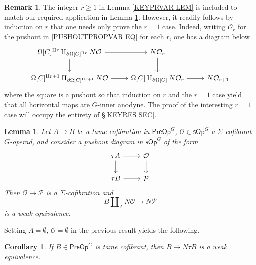\documentclass[a4paper,10pt
,draft
]{article}%
\numberwithin{equation}{section}
\numberwithin{figure}{section}
\newtheorem{lemma}[equation]{Lemma}%
\newtheorem{corollary}[equation]{Corollary}%
\theoremstyle{definition} %
\newtheorem{remark}[equation]{Remark}%
\renewcommand{\O}{\ensuremath{\mathcal O}}
\newcommand{\1}{\ensuremath{\mathbbm 1}}%
\begin{document}
\begin{remark}
	The integer $r \geq 1$ in 
	Lemma \ref{KEYPRVAR LEM}
	is included to match our required application in Lemma \ref{UNITEQUIV LEM}.
	However, it readily follows by induction on $r$ that one needs only prove the $r=1$ case.
	Indeed, writing $\O_r$ for the pushout in 
	\eqref{PUSHOUTPROPVAR EQ}
	for each $r$,
	one has a diagram below
\begin{equation}
\begin{tikzcd}
	\Omega[C]^{\amalg r} \amalg_{\partial \Omega[C]^{\amalg r}} N\mathcal{O} \ar{r} \ar{d}
&
	N \mathcal{O}_r \ar{d}
\\
	\Omega[C]^{\amalg r+1} \amalg_{ \partial \Omega[C]^{\amalg r+1}} N \mathcal{O} \ar{r}
&
	\Omega[C] \amalg_{\partial \Omega[C]} N \mathcal{O}_r \ar{r}
&
	N \mathcal{O}_{r+1}
\end{tikzcd}
\end{equation}
	where the square is a pushout so that induction on $r$ and the $r=1$ case yield that all horizontal maps
	are $G$-inner anodyne.
	The proof of the interesting $r=1$ case will occupy the entirety of \S \ref{KEYRES SEC}.
\end{remark}





\begin{lemma}\label{UNITEQUIV LEM}
	Let $A \to B$ be a tame cofibration in $\mathsf{PreOp}^G$, 
	$\mathcal{O} \in \mathsf{sOp}^G$ a $\Sigma$-cofibrant 
	$G$-operad,
	and consider a pushout diagram in $\mathsf{sOp}^G$ of the form
\begin{equation}\label{THEPUSH EQ}
\begin{tikzcd}
	\tau A \ar{r} \ar{d} & \mathcal{O} \ar{d}
\\
	\tau B \ar{r} & \mathcal{P}
\end{tikzcd}
\end{equation}
	Then $\mathcal{O} \to \mathcal{P}$ is a $\Sigma$-cofibration and 
	\begin{equation}\label{UNITEQUIV EQ}
	B \amalg_{A} N \mathcal{O}
	\to 
	N \mathcal{P}
	\end{equation}
	is a weak equivalence.
\end{lemma}

Setting $A = \emptyset $, $\mathcal{O}= \emptyset$ in the previous result yields the following.

\begin{corollary}\label{KEYEQUIV COR}
	If $B \in \mathsf{PreOp}^G$ is tame cofibrant, then 
	$B \to N \tau B$ is a weak equivalence.
\end{corollary}
\end{document}
